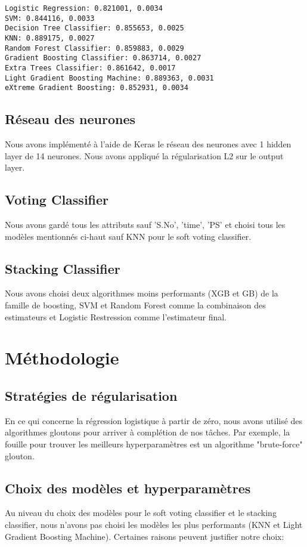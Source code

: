 \documentclass{article}
\begin{document}
\begin{verbatim}
Logistic Regression: 0.821001, 0.0034
SVM: 0.844116, 0.0033
Decision Tree Classifier: 0.855653, 0.0025
KNN: 0.889175, 0.0027
Random Forest Classifier: 0.859883, 0.0029
Gradient Boosting Classifier: 0.863714, 0.0027
Extra Trees Classifier: 0.861642, 0.0017
Light Gradient Boosting Machine: 0.889363, 0.0031
eXtreme Gradient Boosting: 0.852931, 0.0034   
\end{verbatim}

\subsection{Réseau des neurones}
Nous avons implémenté à l'aide de Keras le réseau des neurones avec 1 hidden 
layer de 14 neurones. Nous avons appliqué la régularisation L2 sur le output 
layer.

\subsection{Voting Classifier}
Nous avons gardé tous les attributs sauf 'S.No', 'time', 'PS' et choisi tous les
 modèles mentionnés ci-haut sauf KNN pour le soft voting classifier. 

\subsection{Stacking Classifier}
Nous avons choisi deux algorithmes moins performants (XGB et GB) de la famille 
de boosting, SVM et Random Forest comme la combinaison des estimateurs et 
Logistic Restression comme l'estimateur final. 

\section{Méthodologie}
\subsection{Stratégies de régularisation}
En ce qui concerne la régression logistique à partir de zéro, nous avons utilisé
 des algorithmes gloutons pour arriver à complétion de nos tâches. Par exemple,
  la fouille pour trouver les meilleurs hyperparamètres est un algorithme
   "brute-force" glouton.

\subsection{Choix des modèles et hyperparamètres}
Au niveau du choix des modèles pour le soft voting classifier et le stacking 
classifier, nous n'avons pas choisi les modèles les plus performants 
(KNN et Light Gradient Boosting Machine). Certaines raisons peuvent justifier 
notre choix:
\end{document}

